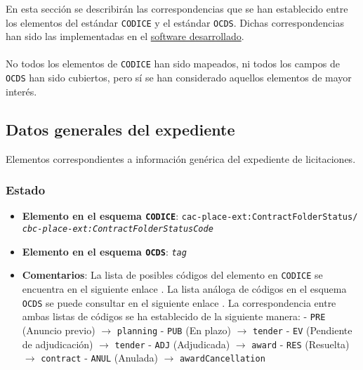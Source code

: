 
    En esta sección se describirán las correspondencias que se han establecido entre los elementos del estándar \texttt{CODICE} y el estándar \texttt{OCDS}. Dichas correspondencias han sido las implementadas en el \hyperref[sec:software]{software desarrollado}.
    \\ \\
    No todos los elementos de \texttt{CODICE} han sido mapeados, ni todos los campos de \texttt{OCDS} han sido cubiertos, pero sí se han considerado aquellos elementos de mayor interés.

    \vspace{0.3cm}
    
    \subsection{Datos generales del expediente}
    
    Elementos correspondientes a información genérica del expediente de licitaciones.
    
        \subsubsection{Estado}
            \begin{itemize}
                \item \textbf{Elemento en el esquema \texttt{CODICE}}:
                    \tabto{7.6cm} \texttt{cac-place-ext:ContractFolderStatus/} \\
                    \tabto{7.6cm} \texttt{\textit{cbc-place-ext:ContractFolderStatusCode}}
                \item \textbf{Elemento en el esquema \texttt{OCDS}}:
                    \tabto{7.6cm} \texttt{\textit{tag}}
                \item \textbf{Comentarios}: La lista de posibles códigos del elemento en \texttt{CODICE} se encuentra en el siguiente enlace \cite{CR1}.
                    La lista análoga de códigos en el esquema \texttt{OCDS} se puede consultar en el siguiente enlace \cite{CR2}.
                    La correspondencia entre ambas listas de códigos se ha establecido de la siguiente manera:
                        \subitem - \texttt{PRE} (Anuncio previo) $\rightarrow$ \texttt{planning}
                        \subitem - \texttt{PUB} (En plazo) $\rightarrow$ \texttt{tender}
                        \subitem - \texttt{EV} (Pendiente de adjudicación) $\rightarrow$ \texttt{tender}
                        \subitem - \texttt{ADJ} (Adjudicada) $\rightarrow$ \texttt{award}
                        \subitem - \texttt{RES} (Resuelta) $\rightarrow$ \texttt{contract}
                        \subitem - \texttt{ANUL} (Anulada) $\rightarrow$ \texttt{awardCancellation}
            \end{itemize}
        
